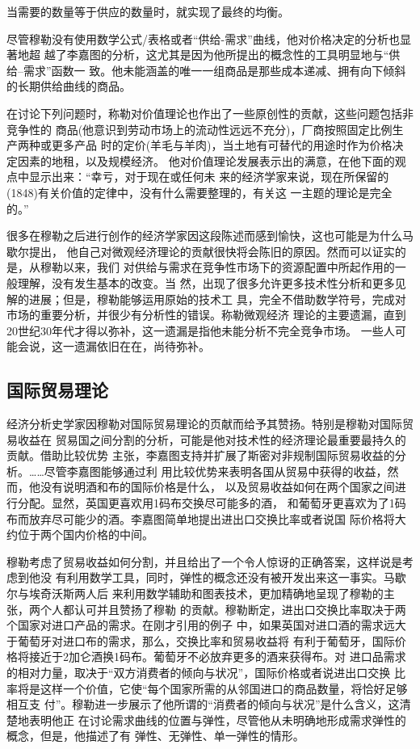 当需要的数量等于供应的数量时，就实现了最终的均衡。

尽管穆勒没有使用数学公式/表格或者“供给-需求”曲线，他对价格决定的分析也显著地超
越了李嘉图的分析，这尤其是因为他所提出的概念性的工具明显地与“供给--需求”函数一
致。他未能涵盖的唯一一组商品是那些成本递减、拥有向下倾斜的长期供给曲线的商品。

在讨论下列问题时，称勒对价值理论也作出了一些原创性的贡献，这些问题包括非竞争性的
商品(他意识到劳动市场上的流动性远远不充分)，厂商按照固定比例生产两种或更多产品
时的定价(羊毛与羊肉)，当土地有可替代的用途时作为价格决定因素的地租，以及规模经济。
他对价值理论发展表示出的满意，在他下面的观点中显示出来：“幸亏，对于现在或任何未
来的经济学家来说，现在所保留的(1848)有关价值的定律中，没有什么需要整理的，有关这
一主题的理论是完全的。”

很多在穆勒之后进行创作的经济学家因这段陈述而感到愉快，这也可能是为什么马歇尔提出，
他自己对微观经济理论的贡献很快将会陈旧的原因。然而可以证实的是，从穆勒以来，我们
对供给与需求在竞争性市场下的资源配置中所起作用的一般理解，没有发生基本的改变。当
然，出现了很多允许更多技术性分析和更多见解的进展；但是，穆勒能够运用原始的技术工
具，完全不借助数学符号，完成对市场的重要分析，并很少有分析性的错误。称勒微观经济
理论的主要遗漏，直到20世纪30年代才得以弥补，这一遗漏是指他未能分析不完全竞争市场。
一些人可能会说，这一遗漏依旧在在，尚待弥补。

\subsection{国际贸易理论}

经济分析史学家因穆勒对国际贸易理论的页献而给予其赞扬。特别是穆勒对国际贸易收益在
贸易国之间分割的分析，可能是他对技术性的经济理论最重要最持久的贡献。借助比较优势
主张，李嘉图支持并扩展了斯密对非规制国际贸易收益的分析。……尽管李嘉图能够通过利
用比较优势来表明各国从贸易中获得的收益，然而，他没有说明酒和布的国际价格是什么，
以及贸易收益如何在两个国家之间进行分配。显然，英国更喜欢用1码布交换尽可能多的酒，
和葡萄牙更喜欢为了1码布而放弃尽可能少的酒。李嘉图简单地提出进出口交换比率或者说国
际价格将大约位于两个国内价格的中间。

穆勒考虑了贸易收益如何分割，并且给出了一个令人惊讶的正确答案，这样说是考虑到他没
有利用数学工具，同时，弹性的概念还没有被开发出来这一事实。马歇尔与埃奇沃斯两人后
来利用数学辅助和图表技术，更加精确地呈现了穆勒的主张，两个人都认可并且赞扬了穆勒
的贡献。穆勒断定，进出口交换比率取决于两个国家对进口产品的需求。在刚才引用的例子
中，如果英国对进口酒的需求远大于葡萄牙对进口布的需求，那么，交换比率和贸易收益将
有利于葡萄牙，国际价格将接近于2加仑酒换1码布。葡萄牙不必放弃更多的酒来获得布。对
进口品需求的相对力量，取决于“双方消费者的倾向与状况”，国际价格或者说进出口交换
比率将是这样一个价值，它使“每个国家所需的从邻国进口的商品数量，将恰好足够相互支
付”。穆勒进一步展示了他所谓的“消费者的倾向与状况”是什么含义，这清楚地表明他正
在讨论需求曲线的位置与弹性，尽管他从未明确地形成需求弹性的概念，但是，他描述了有
弹性、无弹性、单一弹性的情形。

